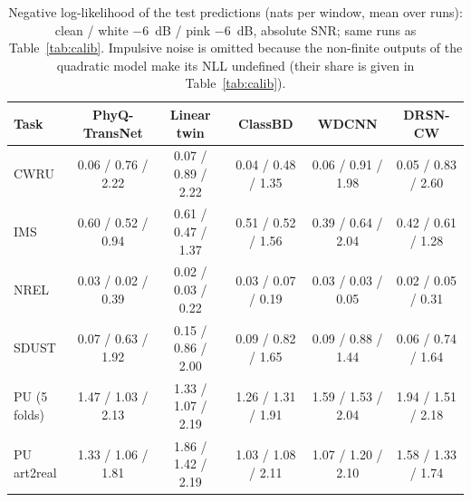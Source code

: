 \begin{table}[!htbp]
\caption{Negative log-likelihood of the test predictions (nats per window, mean over runs): clean / white $-6$~dB / pink $-6$~dB, absolute SNR; same runs as Table~\ref{tab:calib}. Impulsive noise is omitted because the non-finite outputs of the quadratic model make its NLL undefined (their share is given in Table~\ref{tab:calib}).}\label{tab:nll}
\centering\scriptsize\setlength{\tabcolsep}{3pt}
\begin{tabular}{lccccc}
\toprule
Task & PhyQ-TransNet & Linear twin & ClassBD & WDCNN & DRSN-CW \\
\midrule
CWRU & 0.06 / 0.76 / 2.22 & 0.07 / 0.89 / 2.22 & 0.04 / 0.48 / 1.35 & 0.06 / 0.91 / 1.98 & 0.05 / 0.83 / 2.60 \\
IMS & 0.60 / 0.52 / 0.94 & 0.61 / 0.47 / 1.37 & 0.51 / 0.52 / 1.56 & 0.39 / 0.64 / 2.04 & 0.42 / 0.61 / 1.28 \\
NREL & 0.03 / 0.02 / 0.39 & 0.02 / 0.03 / 0.22 & 0.03 / 0.07 / 0.19 & 0.03 / 0.03 / 0.05 & 0.02 / 0.05 / 0.31 \\
SDUST & 0.07 / 0.63 / 1.92 & 0.15 / 0.86 / 2.00 & 0.09 / 0.82 / 1.65 & 0.09 / 0.88 / 1.44 & 0.06 / 0.74 / 1.64 \\
PU (5 folds) & 1.47 / 1.03 / 2.13 & 1.33 / 1.07 / 2.19 & 1.26 / 1.31 / 1.91 & 1.59 / 1.53 / 2.04 & 1.94 / 1.51 / 2.18 \\
PU art2real & 1.33 / 1.06 / 1.81 & 1.86 / 1.42 / 2.19 & 1.03 / 1.08 / 2.11 & 1.07 / 1.20 / 2.10 & 1.58 / 1.33 / 1.74 \\
\bottomrule
\end{tabular}
\end{table}
